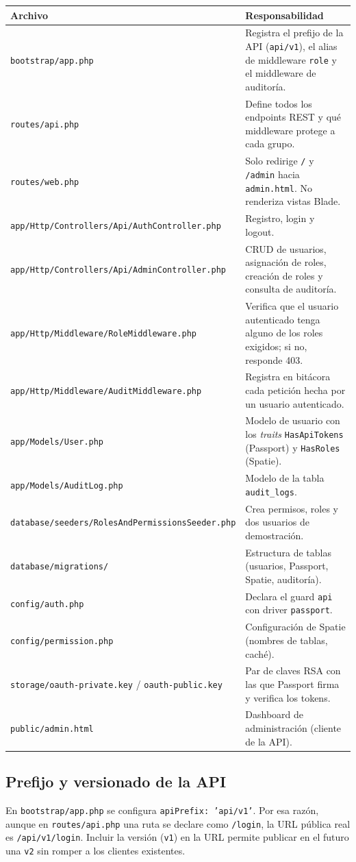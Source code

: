 \begin{longtable}{p{6.4cm}p{8.6cm}}
\toprule
\textbf{Archivo} & \textbf{Responsabilidad} \\
\midrule
\endhead
\texttt{bootstrap/app.php} & Registra el prefijo de la API (\texttt{api/v1}), el alias de middleware \texttt{role} y el middleware de auditoría. \\
\texttt{routes/api.php} & Define todos los endpoints REST y qué middleware protege a cada grupo. \\
\texttt{routes/web.php} & Solo redirige \texttt{/} y \texttt{/admin} hacia \texttt{admin.html}. No renderiza vistas Blade. \\
\texttt{app/Http/Controllers/Api/AuthController.php} & Registro, login y logout. \\
\texttt{app/Http/Controllers/Api/AdminController.php} & CRUD de usuarios, asignación de roles, creación de roles y consulta de auditoría. \\
\texttt{app/Http/Middleware/RoleMiddleware.php} & Verifica que el usuario autenticado tenga alguno de los roles exigidos; si no, responde 403. \\
\texttt{app/Http/Middleware/AuditMiddleware.php} & Registra en bitácora cada petición hecha por un usuario autenticado. \\
\texttt{app/Models/User.php} & Modelo de usuario con los \emph{traits} \texttt{HasApiTokens} (Passport) y \texttt{HasRoles} (Spatie). \\
\texttt{app/Models/AuditLog.php} & Modelo de la tabla \texttt{audit\_logs}. \\
\texttt{database/seeders/RolesAndPermissionsSeeder.php} & Crea permisos, roles y dos usuarios de demostración. \\
\texttt{database/migrations/} & Estructura de tablas (usuarios, Passport, Spatie, auditoría). \\
\texttt{config/auth.php} & Declara el guard \texttt{api} con driver \texttt{passport}. \\
\texttt{config/permission.php} & Configuración de Spatie (nombres de tablas, caché). \\
\texttt{storage/oauth-private.key} / \texttt{oauth-public.key} & Par de claves RSA con las que Passport firma y verifica los tokens. \\
\texttt{public/admin.html} & Dashboard de administración (cliente de la API). \\
\bottomrule
\end{longtable}

\subsection{Prefijo y versionado de la API}
En \texttt{bootstrap/app.php} se configura \texttt{apiPrefix: 'api/v1'}. Por esa razón, aunque en \texttt{routes/api.php} una ruta se declare como \texttt{/login}, la URL pública real es \texttt{/api/v1/login}. Incluir la versión (\texttt{v1}) en la URL permite publicar en el futuro una \texttt{v2} sin romper a los clientes existentes.


